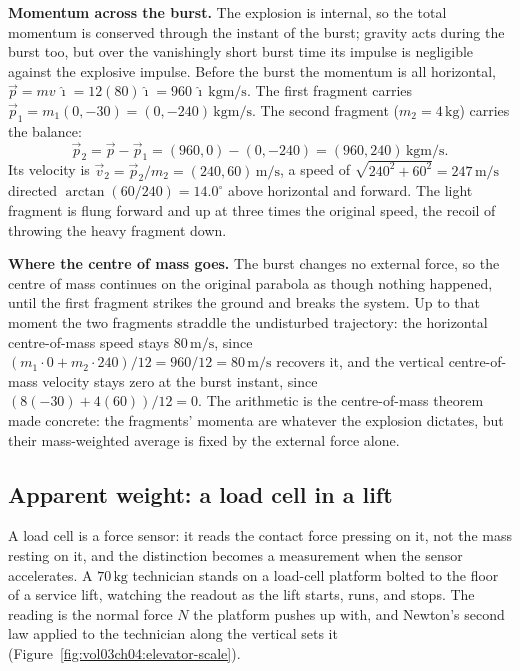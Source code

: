 \textbf{Momentum across the burst.} The explosion is internal, so the
total momentum is conserved through the instant of the burst; gravity
acts during the burst too, but over the vanishingly short burst time its
impulse is negligible against the explosive impulse. Before the burst the
momentum is all horizontal, $\vec{p}=m v\,\hat{\imath}=12(80)\hat{\imath}
=960\,\hat{\imath}\,\si{\kilogram\meter\per\second}$. The first fragment
carries $\vec{p}_{1}=m_{1}(0,-30)=(0,-240)\,\si{\kilogram\meter\per
\second}$. The second fragment ($m_{2}=4\,\si{\kilogram}$) carries the
balance:
\[
\vec{p}_{2}=\vec{p}-\vec{p}_{1}=(960,0)-(0,-240)=(960,240)\,\si{\kilogram
\meter\per\second}.
\]
Its velocity is $\vec{v}_{2}=\vec{p}_{2}/m_{2}=(240,60)\,\si{\meter\per
\second}$, a speed of $\sqrt{240^{2}+60^{2}}=247\,\si{\meter\per\second}$
directed $\arctan(60/240)=14.0^{\circ}$ above horizontal and forward. The
light fragment is flung forward and up at three times the original speed,
the recoil of throwing the heavy fragment down.

\textbf{Where the centre of mass goes.} The burst changes no external
force, so the centre of mass continues on the original parabola as
though nothing happened, until the first fragment strikes the ground and
breaks the system. Up to that moment the two fragments straddle the
undisturbed trajectory: the horizontal centre-of-mass speed stays
$80\,\si{\meter\per\second}$, since $(m_{1}\cdot 0+m_{2}\cdot 240)/12=
960/12=80\,\si{\meter\per\second}$ recovers it, and the vertical
centre-of-mass velocity stays zero at the burst instant, since $(8(-30)+
4(60))/12=0$. The arithmetic is the centre-of-mass theorem made
concrete: the fragments' momenta are whatever the explosion dictates,
but their mass-weighted average is fixed by the external force alone.

\subsection{Apparent weight: a load cell in a lift}

 A load cell is a force sensor: it reads the contact
force pressing on it, not the mass resting on it, and the distinction
becomes a measurement when the sensor accelerates. A
$70\,\si{\kilogram}$ technician stands on a load-cell platform bolted to
the floor of a service lift, watching the readout as the lift starts,
runs, and stops. The reading is the normal force $N$ the platform pushes
up with, and Newton's second law applied to the technician along the
vertical sets it (Figure~\ref{fig:vol03ch04:elevator-scale}).

